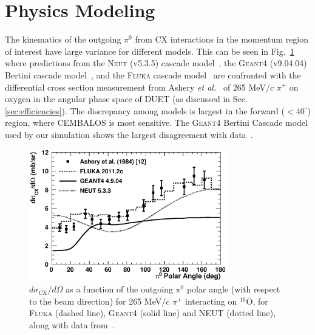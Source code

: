 \section{Physics Modeling}\label{sec:physics}
The kinematics of the outgoing $\pi^0$ from CX interactions in the momentum region of interest have large variance for different models. This can be seen in Fig.~\ref{fig:pi0kinem} where predictions from the \textsc{Neut} (v5.3.5) cascade model~\cite{NEUT}, the \textsc{Geant4} (v9.04.04) Bertini cascade model~\cite{bertini}, and the \textsc{Fluka} cascade model~\cite{fluka1,fluka2} are confronted with the differential cross section measurement from Ashery \textit{et al.}~\cite{Ashery2} of 265 MeV$/c$ $\pi^{+}$ on oxygen in the angular phase space of DUET (as discussed in Sec. \ref{sec:efficiencies}). The discrepancy among models is largest in the forward ($<40^{\circ}$) region, where CEMBALOS is most sensitive. The \textsc{Geant4} Bertini Cascade model used by our simulation shows the largest disagreement with data~\cite{Ashery2}.

\begin{figure}[h]
 \includegraphics[width=86mm]{figures/dsigma_cx_o16_data_and_models_v2.eps}
 \caption{$d\sigma_{\mathrm{CX}}/d\Omega$ as a function of the outgoing $\pi^0$ polar angle (with respect to the beam direction) for 265 MeV$/c$ $\pi^{+}$ interacting on $^{16}$O, for \textsc{Fluka} (dashed line), \textsc{Geant4} (solid line) and \textsc{NEUT} (dotted line), along with data from~\cite{Ashery2}.}
 \label{fig:pi0kinem}
\end{figure}

